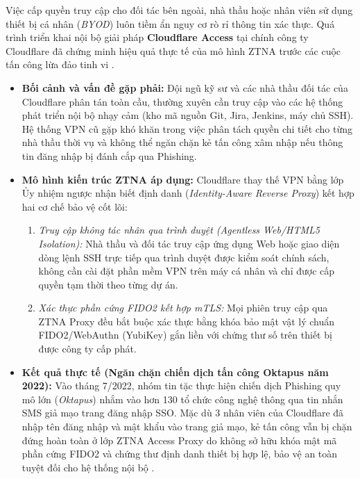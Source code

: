 Việc cấp quyền truy cập cho đối tác bên ngoài, nhà thầu hoặc nhân viên sử dụng thiết bị cá nhân (\textit{BYOD}) luôn tiềm ẩn nguy cơ rò rỉ thông tin xác thực. Quá trình triển khai nội bộ giải pháp \textbf{Cloudflare Access} tại chính công ty Cloudflare đã chứng minh hiệu quả thực tế của mô hình ZTNA trước các cuộc tấn công lừa đảo tinh vi \cite{cloudflare2022}.

\begin{itemize}
    \item \textbf{Bối cảnh và vấn đề gặp phải:} Đội ngũ kỹ sư và các nhà thầu đối tác của Cloudflare phân tán toàn cầu, thường xuyên cần truy cập vào các hệ thống phát triển nội bộ nhạy cảm (kho mã nguồn Git, Jira, Jenkins, máy chủ SSH). Hệ thống VPN cũ gặp khó khăn trong việc phân tách quyền chi tiết cho từng nhà thầu thời vụ và không thể ngăn chặn kẻ tấn công xâm nhập nếu thông tin đăng nhập bị đánh cắp qua Phishing.
    \item \textbf{Mô hình kiến trúc ZTNA áp dụng:} Cloudflare thay thế VPN bằng lớp Ủy nhiệm ngược nhận biết định danh (\textit{Identity-Aware Reverse Proxy}) kết hợp hai cơ chế bảo vệ cốt lõi:
    \begin{enumerate}
        \item \textit{Truy cập không tác nhân qua trình duyệt (Agentless Web/HTML5 Isolation):} Nhà thầu và đối tác truy cập ứng dụng Web hoặc giao diện dòng lệnh SSH trực tiếp qua trình duyệt được kiểm soát chính sách, không cần cài đặt phần mềm VPN trên máy cá nhân và chỉ được cấp quyền tạm thời theo từng dự án.
        \item \textit{Xác thực phần cứng FIDO2 kết hợp mTLS:} Mọi phiên truy cập qua ZTNA Proxy đều bắt buộc xác thực bằng khóa bảo mật vật lý chuẩn FIDO2/WebAuthn (YubiKey) gắn liền với chứng thư số trên thiết bị được công ty cấp phát.
    \end{enumerate}
    \item \textbf{Kết quả thực tế (Ngăn chặn chiến dịch tấn công Oktapus năm 2022):} Vào tháng 7/2022, nhóm tin tặc thực hiện chiến dịch Phishing quy mô lớn (\textit{Oktapus}) nhắm vào hơn 130 tổ chức công nghệ thông qua tin nhắn SMS giả mạo trang đăng nhập SSO. Mặc dù 3 nhân viên của Cloudflare đã nhập tên đăng nhập và mật khẩu vào trang giả mạo, kẻ tấn công vẫn bị chặn đứng hoàn toàn ở lớp ZTNA Access Proxy do không sở hữu khóa mật mã phần cứng FIDO2 và chứng thư định danh thiết bị hợp lệ, bảo vệ an toàn tuyệt đối cho hệ thống nội bộ \cite{cloudflare2022}.
\end{itemize}

